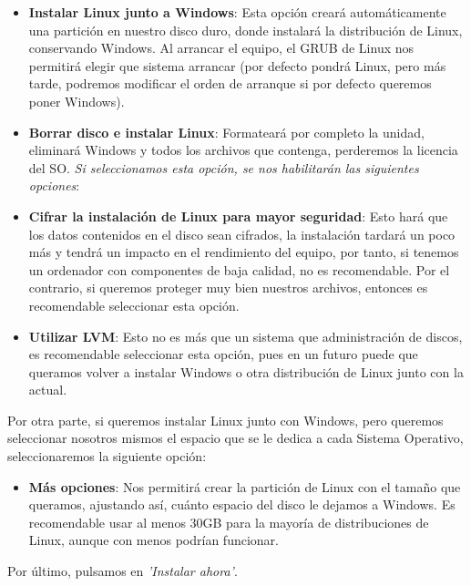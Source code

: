 \begin{itemize}
    \item \textbf{Instalar Linux junto a Windows}: Esta opción creará automáticamente una partición en nuestro disco duro, donde instalará la distribución de Linux, conservando Windows. Al arrancar el equipo, el GRUB de Linux nos permitirá elegir que sistema arrancar (por defecto pondrá Linux, pero más tarde, podremos modificar el orden de arranque si por defecto queremos poner Windows).
    \item \textbf{Borrar disco e instalar Linux}: Formateará por completo la unidad, eliminará Windows y todos los archivos que contenga, perderemos la licencia del SO.
    \newline \textit{Si seleccionamos esta opción, se nos habilitarán las siguientes opciones}:
    \item \textbf{Cifrar la instalación de Linux para mayor seguridad}: Esto hará que los datos contenidos en el disco sean cifrados, la instalación tardará un poco más y tendrá un impacto en el rendimiento del equipo, por tanto, si tenemos un ordenador con componentes de baja calidad, no es recomendable. Por el contrario, si queremos proteger muy bien nuestros archivos, entonces es recomendable seleccionar esta opción.
    \item \textbf{Utilizar LVM}: Esto no es más que un sistema que administración de discos, es recomendable seleccionar esta opción, pues en un futuro puede que queramos volver a instalar Windows o otra distribución de Linux junto con la actual.
\end{itemize}
Por otra parte, si queremos instalar Linux junto con Windows, pero queremos seleccionar nosotros mismos el espacio que se le dedica a cada Sistema Operativo, seleccionaremos la siguiente opción:
\begin{itemize}
    \item \textbf{Más opciones}: Nos permitirá crear la partición de Linux con el tamaño que queramos, ajustando así, cuánto espacio del disco le dejamos a Windows. Es recomendable usar al menos 30GB para la mayoría de distribuciones de Linux, aunque con menos podrían funcionar.
\end{itemize}
Por último, pulsamos en \textit{'Instalar ahora'}.

